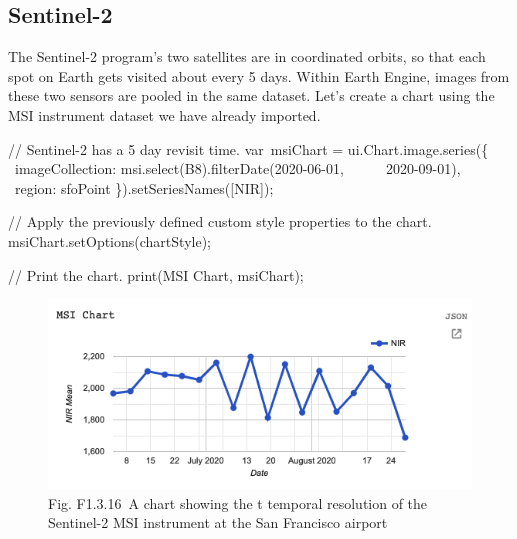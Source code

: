 \documentclass[
  letterpaper,
  DIV=11,
  numbers=noendperiod]{scrreprt}
\newenvironment{Shaded}{\begin{snugshade}}{\end{snugshade}}
\newcommand{\AttributeTok}[1]{\textcolor[rgb]{0.40,0.45,0.13}{#1}}
\newcommand{\CommentTok}[1]{\textcolor[rgb]{0.37,0.37,0.37}{#1}}
\newcommand{\DataTypeTok}[1]{\textcolor[rgb]{0.68,0.00,0.00}{#1}}
\newcommand{\FunctionTok}[1]{\textcolor[rgb]{0.28,0.35,0.67}{#1}}
\newcommand{\NormalTok}[1]{\textcolor[rgb]{0.00,0.23,0.31}{#1}}
\newcommand{\OperatorTok}[1]{\textcolor[rgb]{0.37,0.37,0.37}{#1}}
\newcommand{\StringTok}[1]{\textcolor[rgb]{0.13,0.47,0.30}{#1}}
\begin{document}
\hypertarget{sentinel-2}{%
\subsection{Sentinel-2}\label{sentinel-2}}

The Sentinel-2 program's two satellites are in coordinated orbits, so
that each spot on Earth gets visited about every 5 days. Within Earth
Engine, images from these two sensors are pooled in the same dataset.
Let's create a chart using the MSI instrument dataset we have already
imported.

\begin{Shaded}
\begin{Highlighting}[]
\CommentTok{// Sentinel{-}2 has a 5 day revisit time.  }
\NormalTok{var msiChart }\OperatorTok{=}\NormalTok{ ui}\OperatorTok{.}\AttributeTok{Chart}\OperatorTok{.}\AttributeTok{image}\OperatorTok{.}\FunctionTok{series}\NormalTok{(\{  }
  \DataTypeTok{ imageCollection}\OperatorTok{:}\NormalTok{ msi}\OperatorTok{.}\FunctionTok{select}\NormalTok{(}\StringTok{\textquotesingle{}B8\textquotesingle{}}\NormalTok{)}\OperatorTok{.}\FunctionTok{filterDate}\NormalTok{(}\StringTok{\textquotesingle{}2020{-}06{-}01\textquotesingle{}}\OperatorTok{,}       \StringTok{\textquotesingle{}2020{-}09{-}01\textquotesingle{}}\NormalTok{)}\OperatorTok{,}  
  \DataTypeTok{ region}\OperatorTok{:}\NormalTok{ sfoPoint  }
\NormalTok{\})}\OperatorTok{.}\FunctionTok{setSeriesNames}\NormalTok{([}\StringTok{\textquotesingle{}NIR\textquotesingle{}}\NormalTok{])}\OperatorTok{;}  
  
\CommentTok{// Apply the previously defined custom style properties to the chart.  }
\NormalTok{msiChart}\OperatorTok{.}\FunctionTok{setOptions}\NormalTok{(chartStyle)}\OperatorTok{;}  
  
\CommentTok{// Print the chart.  }
\FunctionTok{print}\NormalTok{(}\StringTok{\textquotesingle{}MSI Chart\textquotesingle{}}\OperatorTok{,}\NormalTok{ msiChart)}\OperatorTok{;}
\end{Highlighting}
\end{Shaded}

\begin{figure}

{\centering \includegraphics{./F1/image60.png}

}

\caption{Fig. F1.3.16~A chart showing the t temporal resolution of the
Sentinel-2 MSI instrument at the San Francisco airport}

\end{figure}
\end{document}

